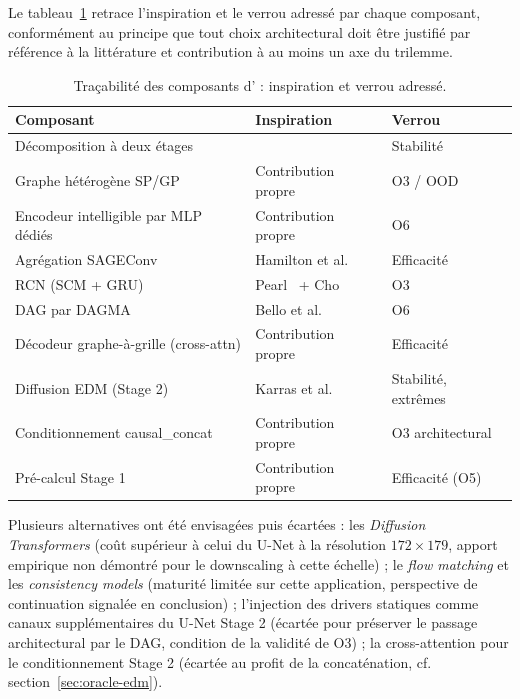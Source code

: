 \label{sec:oracle-synthese}

Le tableau~\ref{tab:tracabilite} retrace l'inspiration et le verrou adressé par chaque composant, conformément au principe que tout choix architectural doit être justifié par référence à la littérature et contribution à au moins un axe du trilemme.

\begin{table}[ht]
  \centering
  \small
  \caption[Traçabilité des composants]{Traçabilité des composants d'\Oracle{} : inspiration et verrou adressé.}
  \label{tab:tracabilite}
  \begin{tabularx}{\linewidth}{l X l}
    \toprule
    \textbf{Composant} & \textbf{Inspiration} & \textbf{Verrou} \\
    \midrule
    Décomposition à deux étages & \CorrDiff{}~\cite{mardani_corrdiff_2023} & Stabilité\\
    Graphe hétérogène SP/GP & Contribution propre & O3 / OOD\\
    Encodeur intelligible par MLP dédiés & Contribution propre & O6\\
    Agrégation SAGEConv & Hamilton et al.~\cite{hamilton_sage_2017} & Efficacité\\
    RCN (SCM + GRU) & Pearl~\cite{pearl_causality_2009} + Cho~\cite{cho_gru_2014} & O3\\
    DAG par DAGMA & Bello et al.~\cite{bello_dagma_2022} & O6\\
    Décodeur graphe-à-grille (cross-attn) & Contribution propre & Efficacité\\
    Diffusion EDM (Stage 2) & Karras et al.~\cite{karras_edm_2022} & Stabilité, extrêmes\\
    Conditionnement causal\_concat & Contribution propre & O3 architectural\\
    Pré-calcul Stage 1 & Contribution propre & Efficacité (O5)\\
    \bottomrule
  \end{tabularx}
\end{table}

Plusieurs alternatives ont été envisagées puis écartées : les \emph{Diffusion Transformers} (coût supérieur à celui du U-Net à la résolution $172\times 179$, apport empirique non démontré pour le downscaling à cette échelle) ; le \emph{flow matching} et les \emph{consistency models} (maturité limitée sur cette application, perspective de continuation signalée en conclusion) ; l'injection des drivers statiques comme canaux supplémentaires du U-Net Stage 2 (écartée pour préserver le passage architectural par le DAG, condition de la validité de O3) ; la cross-attention pour le conditionnement Stage 2 (écartée au profit de la concaténation, cf. section~\ref{sec:oracle-edm}).

